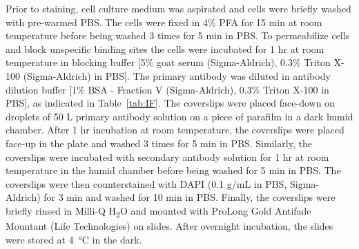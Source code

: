 \normalfont Prior to staining, cell culture medium was aspirated and cells were briefly washed with pre-warmed PBS. The cells were fixed in 4\% PFA for 15 min at room temperature before being washed 3 times for 5 min in PBS. To permeabilize cells and block unspecific binding sites the cells were incubated for 1 hr at room temperature in blocking buffer [5\% goat serum (Sigma-Aldrich), 0.3\% Triton X-100 (Sigma-Aldrich) in PBS]. The primary antibody was diluted in antibody dilution buffer [1\% BSA - Fraction V (Sigma-Aldrich), 0.3\% Triton X-100 in PBS], as indicated in Table~\ref{tab:IF}. The coverslips were placed face-down on droplets of 50 {}\textmu L primary antibody solution on a piece of parafilm in a dark humid chamber. After 1 hr incubation at room temperature, the coverslips were placed face-up in the plate and washed 3 times for 5 min in PBS. Similarly, the coverslips were incubated with secondary antibody solution for 1 hr at room temperature in the humid chamber before being washed for 5 min in PBS. The coverslips were then counterstained with DAPI (0.1 {}\textmu g/mL in PBS, Sigma-Aldrich) for 3 min and washed for 10 min in PBS. Finally, the coverslips were briefly rinsed in Milli-Q H\textsubscript{2}O and mounted with ProLong Gold Antifade Mountant (Life Technologies) on slides. After overnight incubation, the slides were stored at \SI{4}{\celsius} in the dark.

